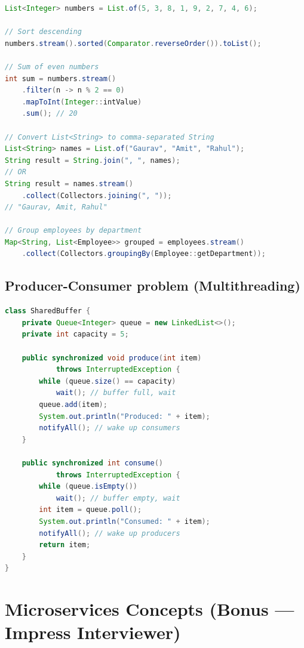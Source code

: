 \documentclass[12pt,a4paper]{article}
\begin{document}
\begin{answerbox}
\begin{lstlisting}[language=Java]
List<Integer> numbers = List.of(5, 3, 8, 1, 9, 2, 7, 4, 6);

// Sort descending
numbers.stream().sorted(Comparator.reverseOrder()).toList();

// Sum of even numbers
int sum = numbers.stream()
    .filter(n -> n % 2 == 0)
    .mapToInt(Integer::intValue)
    .sum(); // 20

// Convert List<String> to comma-separated String
List<String> names = List.of("Gaurav", "Amit", "Rahul");
String result = String.join(", ", names);
// OR
String result = names.stream()
    .collect(Collectors.joining(", ")); 
// "Gaurav, Amit, Rahul"

// Group employees by department
Map<String, List<Employee>> grouped = employees.stream()
    .collect(Collectors.groupingBy(Employee::getDepartment));
\end{lstlisting}
\end{answerbox}

\subsection{Producer-Consumer problem (Multithreading)}

\begin{answerbox}
\begin{lstlisting}[language=Java]
class SharedBuffer {
    private Queue<Integer> queue = new LinkedList<>();
    private int capacity = 5;
    
    public synchronized void produce(int item) 
            throws InterruptedException {
        while (queue.size() == capacity)
            wait(); // buffer full, wait
        queue.add(item);
        System.out.println("Produced: " + item);
        notifyAll(); // wake up consumers
    }
    
    public synchronized int consume() 
            throws InterruptedException {
        while (queue.isEmpty())
            wait(); // buffer empty, wait
        int item = queue.poll();
        System.out.println("Consumed: " + item);
        notifyAll(); // wake up producers
        return item;
    }
}
\end{lstlisting}
\end{answerbox}

\section{Microservices Concepts (Bonus --- Impress Interviewer)}
\end{document}
